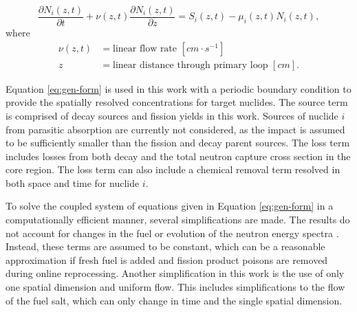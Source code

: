 \documentclass{style/nseJournal}
\begin{document}
\begin{equation}
    \frac{\partial N_i (z, t)}{\partial t} + \nu(z, t) \frac{\partial N_i (z, t)}{\partial z} = S_i(z, t) - \mu_i(z, t) N_i(z, t),
\label{eq:gen-form}
\end{equation}
where
\begin{align}
    \nu(z, t) &= \text{linear flow rate $[cm \cdot s^{-1}]$} \nonumber \\
    z &= \text{linear distance through primary loop $[cm]$}.
\end{align}

Equation \eqref{eq:gen-form} is used in this work with a periodic boundary condition to provide the spatially resolved concentrations for target nuclides.
The source term is comprised of decay sources and fission yields in this work.
Sources of nuclide $i$ from parasitic absorption are currently not considered, as the impact is assumed to be sufficiently smaller than the fission and decay parent sources.
The loss term includes losses from both decay and the total neutron capture cross section in the core region.
The loss term can also include a chemical removal term resolved in both space and time for nuclide $i$.


To solve the coupled system of equations given in Equation \eqref{eq:gen-form} in a computationally efficient manner, several simplifications are made. 
The results do not account for changes in the fuel or evolution of the neutron energy spectra \cite{openmc}.
Instead, these terms are assumed to be constant, which can be a reasonable approximation if fresh fuel is added and fission product poisons are removed during online reprocessing.
Another simplification in this work is the use of only one spatial dimension and uniform flow.
This includes simplifications to the flow of the fuel salt, which can only change in time and the single spatial dimension.
\end{document}
